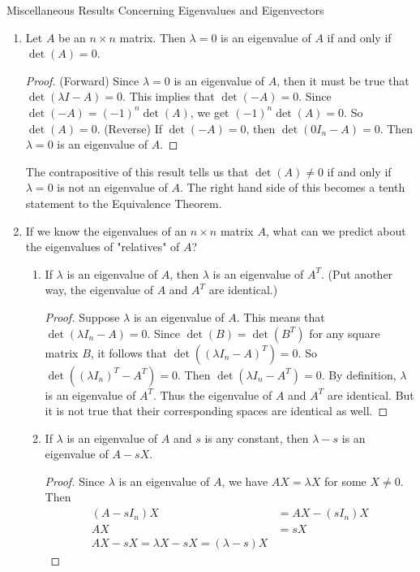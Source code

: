 \documentclass[12pt]{article}
\begin{document}
Miscellaneous Results Concerning Eigenvalues and Eigenvectors \begin{enumerate} 
\item \begin{theorem} Let $A$ be an $n \times n$ matrix. Then $\lambda = 0$ is an eigenvalue of $A$ if and only if $\det(A) = 0$. \end{theorem} 
\begin{proof} (Forward) Since $\lambda = 0$ is an eigenvalue of $A$, then it must be true that $\det(\lambda I - A) = 0$. This implies that $\det(-A) = 0$. Since $\det(-A) = (-1)^n\det(A)$, we get $(-1)^n\det(A) = 0$. So $\det(A) = 0$. \newline (Reverse) If $\det(-A) = 0$, then $\det(0I_n - A) = 0$. Then $\lambda = 0$ is an eigenvalue of $A$. \end{proof} The contrapositive of this result tells us that $\det(A) \neq 0$ if and only if $\lambda = 0$ is not an eigenvalue of $A$. The right hand side of this becomes a tenth statement to the Equivalence Theorem. 
\item If we know the eigenvalues of an $n \times n$ matrix $A$, what can we predict about the eigenvalues of "relatives" of $A$? \begin{enumerate} \item If $\lambda$ is an eigenvalue of $A$, then $\lambda$ is an eigenvalue of $A^T$. (Put another way, the eigenvalue of $A$ and $A^T$ are identical.) \begin{proof} Suppose $\lambda$ is an eigenvalue of $A$. This means that $\det(\lambda I_n - A) = 0$. Since $\det(B) = \det(B^T)$ for any square matrix $B$, it follows that $\det((\lambda I_n - A)^T) = 0$. So $\det((\lambda I_n)^T - A^T) = 0$. Then $\det(\lambda I_n - A^T) = 0$. By definition, $\lambda$ is an eigenvalue of $A^T$. Thus the eigenvalue of $A$ and $A^T$ are identical. But it is not true that their corresponding spaces are identical as well. \end{proof} 
\item If $\lambda$ is an eigenvalue of $A$ and $s$ is any constant, then $\lambda - s$ is an eigenvalue of $A - sX$. \begin{proof} Since $\lambda$ is an eigenvalue of $A$, we have $AX = \lambda X$ for some $X \neq 0$. Then $$\begin{aligned} (A - sI_n)X &= AX - (sI_n)X \\ AX &= sX \\ AX - sX = \lambda X - sX = (\lambda - s)X \end{aligned} $$ 

\end{proof}
\end{enumerate}
\end{enumerate}
\end{document}
